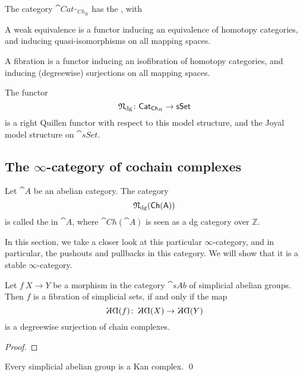 \begin{theorem}
    The category $\cat{Cat}_{\cat{Ch}_R}$ has the , with
    \begin{itms}
        \item A weak equivalence is a functor inducing an equivalence of 
        homotopy categories, and inducing quasi-isomorphisms on all mapping spaces.
        \item A fibration is a functor inducing an isofibration of 
        homotopy categories, and inducing (degreewise) surjections on all mapping spaces.
    \end{itms}
    The functor
    \[\mathfrak{N}_{\mathrm{dg}}\colon\mathsf{Cat}_{\mathsf{Ch}_R}\to\mathsf{sSet}\]
    is a right Quillen functor with respect to this model structure,
    and the Joyal model structure on $\cat{sSet}$.
\end{theorem}

\subsection{The \texorpdfstring{$\infty$}{∞}-category of cochain complexes}

\begin{definition}
    Let $\cat{A}$ be an abelian category.
    The category \[\mathfrak{N}_{\mathrm{dg}}(\mathsf{Ch}(\mathsf{A}))\]
    is called the  in $\cat{A}$,
    where $\cat{Ch}(\cat{A})$ is seen as a dg category over $\mathbb{Z}$.
\end{definition}

In this section, we take a closer look at this particular $\infty$-category,
and in particular, the pushouts and pullbacks in this category.
We will show that it is a stable $\infty$-category.

\begin{proposition}
    Let $f\:X\to Y$ be a morphism in the category $\cat{sAb}$
    of simplicial abelian groups. Then $f$ is a fibration of simplicial sets,
    if and only if the map 
    \[\KD(f)\:\KD(X)\to\KD(Y)\]
    is a degreewise surjection of chain complexes.
\end{proposition}

\begin{proof}
    \nyw
\end{proof}

\begin{corollary}
    Every simplicial abelian group is a Kan complex. \qed
\end{corollary}


